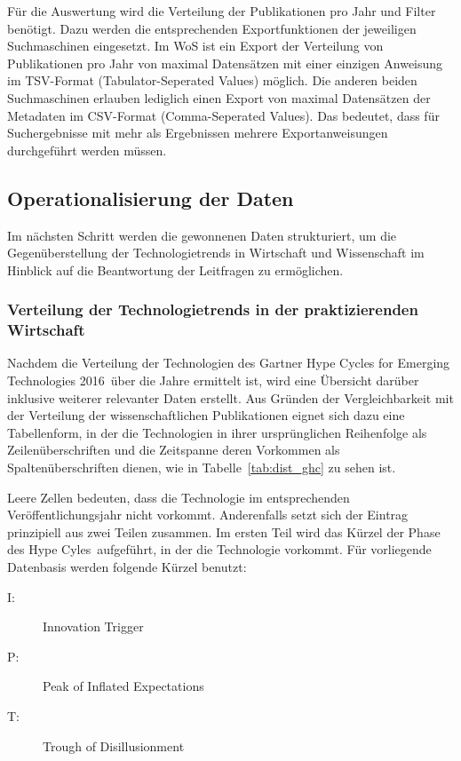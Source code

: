 Für die Auswertung wird die Verteilung der Publikationen pro Jahr und Filter benötigt. Dazu werden die entsprechenden Exportfunktionen der jeweiligen Suchmaschinen eingesetzt. Im WoS ist ein Export der Verteilung von Publikationen pro Jahr von maximal  Datensätzen mit einer einzigen Anweisung im TSV-Format (Tabulator-Seperated Values) möglich. Die anderen beiden Suchmaschinen erlauben lediglich einen Export von maximal  Datensätzen der Metadaten im CSV-Format (Comma-Seperated Values). Das bedeutet, dass für Suchergebnisse mit mehr als  Ergebnissen mehrere Exportanweisungen durchgeführt werden müssen.

\subsection{Operationalisierung der Daten}
Im nächsten Schritt werden die gewonnenen Daten strukturiert, um die Gegenüberstellung der Technologietrends in Wirtschaft und Wissenschaft im Hinblick auf die Beantwortung der Leitfragen zu ermöglichen.

\subsubsection{Verteilung der Technologietrends in der praktizierenden Wirtschaft}
Nachdem die Verteilung der Technologien des \glqq Gartner Hype Cycles for Emerging Technologies 2016\grqq~über die Jahre ermittelt ist, wird eine Übersicht darüber inklusive weiterer relevanter Daten erstellt. Aus Gründen der Vergleichbarkeit mit der Verteilung der wissenschaftlichen Publikationen eignet sich dazu eine Tabellenform, in der die Technologien in ihrer ursprünglichen Reihenfolge als Zeilenüberschriften und die Zeitspanne deren Vorkommen als Spaltenüberschriften dienen, wie in Tabelle~\ref{tab:dist_ghc} zu sehen ist.

Leere Zellen bedeuten, dass die Technologie im entsprechenden Veröffentlichungsjahr nicht vorkommt. Anderenfalls setzt sich der Eintrag prinzipiell aus zwei Teilen zusammen. Im ersten Teil wird das Kürzel der Phase des \glqq Hype Cyles\grqq~aufgeführt, in der die Technologie vorkommt. Für vorliegende Datenbasis werden folgende Kürzel benutzt:

\begin{description}
	\item[I:] Innovation Trigger
	\item[P:] Peak of Inflated Expectations
	\item[T:] Trough of Disillusionment
\end{description}


